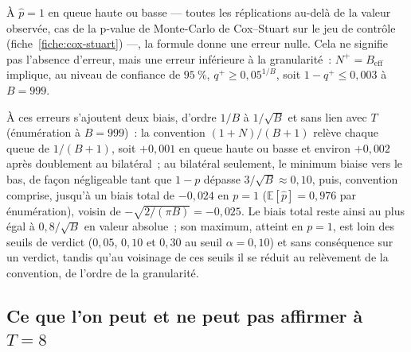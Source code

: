 \documentclass[a4paper,11pt]{article}
\begin{document}
À $\hat p = 1$ en queue haute ou basse --- toutes les réplications au-delà de la valeur
observée, cas de la p-value de Monte-Carlo de Cox--Stuart sur le jeu de contrôle
(fiche~\ref{fiche:cox-stuart}) ---, la formule donne une erreur nulle. Cela ne signifie pas
l'absence d'erreur, mais une erreur inférieure à la granularité~: $N^{+} = B_{\text{eff}}$
implique, au niveau de confiance de $95~\%$, $q^{+} \ge 0{,}05^{1/B}$, soit $1 - q^{+} \le 0{,}003$
à $B = 999$.

À ces erreurs s'ajoutent deux biais, d'ordre $1/B$ à $1/\sqrt{B}$ et sans lien avec $T$
(énumération à $B = 999$)~: la convention $(1+N)/(B+1)$ relève chaque queue de $1/(B+1)$, soit
$+0{,}001$ en queue haute ou basse et environ $+0{,}002$ après doublement au bilatéral~; au
bilatéral seulement, le minimum biaise vers le bas, de façon négligeable tant que $1 - p$
dépasse $3/\sqrt{B} \approx 0{,}10$, puis, convention comprise, jusqu'à un biais total de
$-0{,}024$ en $p = 1$ ($\mathbb{E}[\hat p] = 0{,}976$ par énumération), voisin de
$-\sqrt{2/(\pi B)} = -0{,}025$. Le biais total reste ainsi au plus
égal à $0{,}8/\sqrt{B}$ en valeur absolue~; son maximum, atteint en $p = 1$, est loin des seuils
de verdict ($0{,}05$, $0{,}10$ et $0{,}30$ au seuil $\alpha = 0{,}10$) et sans conséquence sur
un verdict, tandis qu'au voisinage de ces seuils il se réduit au relèvement de la convention,
de l'ordre de la granularité.

\subsection{Ce que l'on peut et ne peut pas affirmer à $T = 8$}
\label{sec:t8}
\end{document}

